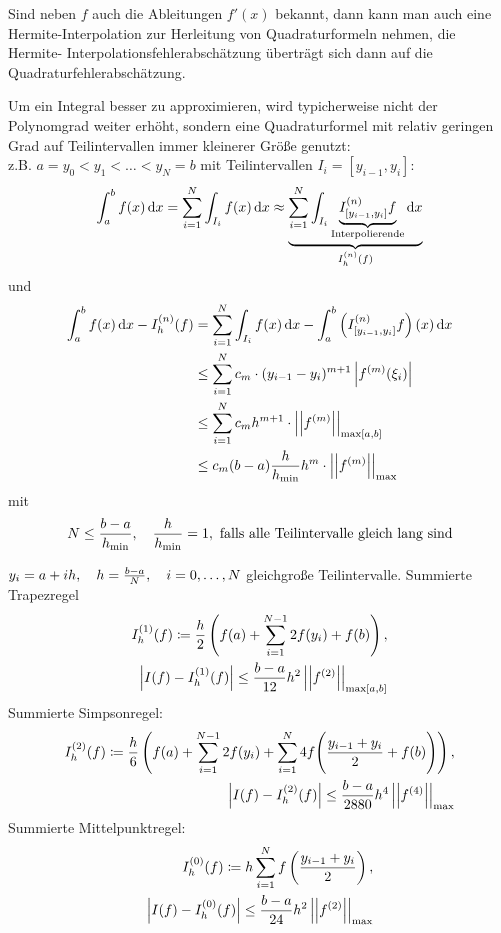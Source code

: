 \documentclass{../Skript}
\begin{document}
\begin{remark}
    Sind neben $f$ auch die Ableitungen $f'(x)$ bekannt, dann kann man 
    auch eine 
    Hermite-Interpolation zur Herleitung von Quadraturformeln nehmen, 
    die Hermite-
    Interpolationsfehlerabschätzung überträgt sich dann auf die 
    Quadraturfehlerabschätzung.
\end{remark}
Um ein Integral besser zu approximieren, wird typicherweise nicht der 
Polynomgrad 
weiter erhöht, sondern eine Quadraturformel mit relativ geringen Grad 
auf 
Teilintervallen immer kleinerer Größe genutzt:\\
z.B.    $a = y_0 < y_1 < \dots < y_N = b$ mit Teilintervallen $I_i = 
[y_{i-1}, 
    y_i]$:\[
        \int_a^b f(x)\mathop{}\!\mathrm{d} x = \sum_{i=1}^N \int_{I_i}f(x)\mathop{}\!\mathrm{d} x\approx
        \underset{I_h^{(n)}(f)}{\underbrace{\displaystyle\sum_{i=1}^N \int_{I_i} 
        \underset{\text{Interpolierende}}
        {\underbrace{I^{(n)}_{[y_{i-1}, y_i]}f}}\mathop{}\!\mathrm{d} x}}
    \] 
    und \begin{align*}
                \int_a^b f(x)\mathop{}\!\mathrm{d} x - I_h^{(n)}(f) &= \displaystyle\sum_{i=1}^N 
                \int_{I_i}f(x)\mathop{}\!\mathrm{d} x - \int_a^b\left(I_{[y_{i-1}, 
                y_i]}^{(n)}f\right)(x)\mathop{}\!\mathrm{d} x\\
                &\leq \displaystyle\sum_{i=1}^N c_m\cdot(y_{i-1}-
                y_i)^{m+1}\left\vert f^{(m)}
                (\xi_i) \right\vert\\
                &\leq \displaystyle\sum_{i=1}^N c_mh^{m+1}\cdot 
                \left\vert\left\vert f^{(m)}\right\vert\right\vert_{\max[a,b]}\\
                &\leq c_m(b-a)\frac{h}
                {h_{\min}}h^{m}\cdot\left\vert\left\vert f^{(m)}\right\vert\right\vert_{\max}
    \end{align*}
    mit \[
        N\leq \frac{b-a}{h_{\min}} , \hspace{1em} \frac{h}{h_{\min}}= 1, 
        \text{ 
        falls 
        alle Teilintervalle gleich lang sind}
    \]
\begin{example}
    $y_i = a+ih, \largespace h=\frac{b-a}{N}, \largespace \igb i 0 N$ 
    gleichgroße 
    Teilintervalle. 
    Summierte Trapezregel \begin{align*}
        I^{(1)}_h(f)\coloneqq \frac{h}{2}\left(f(a)+ \displaystyle\sum_{i=1}^{N-
        1}2f(y_i)+f(b)\right), \\
        \left\vert I(f)-I^{(1)}_h(f) \right\vert\leq \frac{b-a}{12}h^2
        \left\vert \left\vert f^{(2)} \right\vert \right\vert_{\max[a,b]}
    \end{align*}
    Summierte Simpsonregel: \begin{align*}
        I^{(2)}_h(f)\coloneqq \frac{h}{6}\left(f(a)+ \displaystyle\sum_{i=1}^{N-
        1}2f(y_i)+\displaystyle\sum_{i=1}^{N}4f\middle(\frac{y_{i-1}+y_i}
        {2}+f(b)\middle)
        \right), \\
        \left\vert I(f)-I^{(2)}_h(f) \right\vert\leq \frac{b-a}{2880}h^4
        \left\vert \left\vert f^{(4)} \right\vert \right\vert_{\max}
    \end{align*}
    Summierte Mittelpunktregel: \begin{align*}
        I^{(0)}_h(f)\coloneqq h\displaystyle\sum_{i=1}^{N}f\left(\frac{y_{i-1}+y_i}
        {2}\right), \\
        \left\vert I(f)-I^{(0)}_h(f) \right\vert\leq \frac{b-a}{24}h^2
        \left\vert \left\vert f^{(2)} \right\vert \right\vert_{\max}
    \end{align*}
\end{example}
\end{document}
